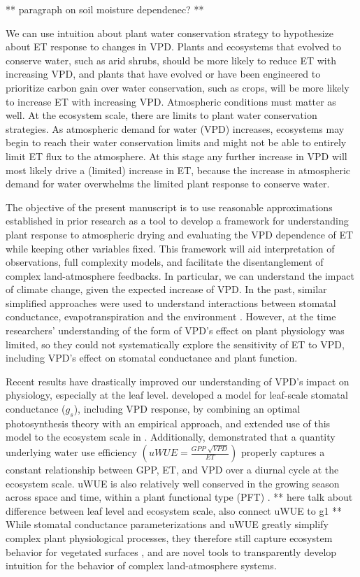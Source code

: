 ** paragraph on soil moisture dependenec? **

We can use intuition about plant water conservation strategy to
hypothesize about ET response to changes in VPD. Plants and ecosystems
that evolved to conserve water, such as arid shrubs, should be more
likely to reduce ET with increasing VPD, and plants that have evolved
or have been engineered to prioritize carbon gain over water
conservation, such as crops, will be more likely to increase ET with
increasing VPD. Atmospheric conditions must matter as well. At the
ecosystem scale, there are limits to plant water conservation
strategies. As atmospheric demand for water (VPD) increases,
ecosystems may begin to reach their water conservation limits and
might not be able to entirely limit ET flux to the atmosphere. At this
stage any further increase in VPD will most likely drive a (limited)
increase in ET, because the increase in atmospheric demand for water
overwhelms the limited plant response to conserve water.

The objective of the present manuscript is to use reasonable
approximations established in prior research as a tool to develop a
framework for understanding plant response to atmospheric drying and
evaluating the VPD dependence of ET while keeping other variables
fixed. This framework will aid interpretation of observations, full
complexity models, and facilitate the disentanglement of complex
land-atmosphere feedbacks. In particular, we can understand the impact
of climate change, given the expected increase of VPD.  In the past,
similar simplified approaches were used to understand interactions
between stomatal conductance, evapotranspiration and the environment
\citep[e.g.,][]{Jarvis_1984, Jarvis_1986, Mcnaughton_1991}. However,
at the time researchers' understanding of the form of VPD's effect on
plant physiology was limited, so they could not systematically explore
the sensitivity of ET to VPD, including VPD's effect on stomatal
conductance and plant function.

Recent results have drastically improved our understanding of VPD's
impact on physiology, especially at the leaf
level. \citet{MEDLYN_2011} developed a model for leaf-scale stomatal
conductance ($g_s$), including VPD response, by combining an optimal
photosynthesis theory \citep{Cowan_1977, Katul_2009} with an empirical
approach, and extended use of this model to the ecosystem scale in
\citet{Medlyn_2017}. Additionally, \citet{Zhou_2014} demonstrated that
a quantity underlying water use efficiency $\left(uWUE = \frac{GPP\;
\sqrt{VPD}}{ET}\right)$ properly captures a constant relationship
between GPP, ET, and VPD over a diurnal cycle at the ecosystem
scale. uWUE is also relatively well conserved in the growing season
across space and time, within a plant functional type (PFT)
\citep{Zhou_2015}. ** here talk about difference between leaf level
and ecosystem scale, also connect uWUE to g1 ** While stomatal
conductance parameterizations and uWUE greatly simplify complex plant
physiological processes, they therefore still capture ecosystem
behavior for vegetated surfaces \citep{Medlyn_2017, Zhou_2014}, and
are novel tools to transparently develop intuition for the behavior of
complex land-atmosphere systems.

